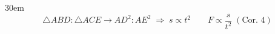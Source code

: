 \documentclass[border=4pt]{standalone}
\begin{document}
\begin{varwidth}{30em}
\large
\[ \triangle ABD : \triangle ACE \to AD^2 : AE^2 \;\Rightarrow\; s \propto t^2 \qquad F \propto \frac{s}{t^2}\;(\text{Cor. }4) \]

\end{varwidth}
\end{document}
